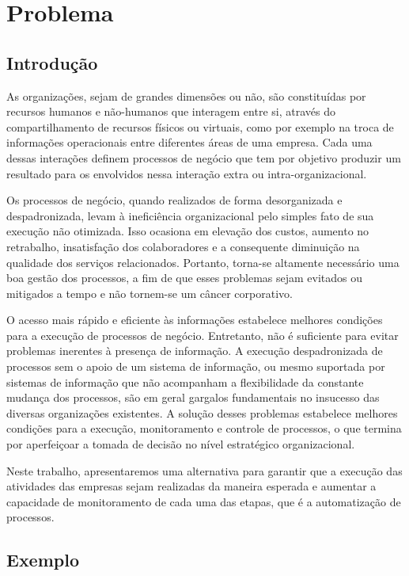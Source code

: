\chapter{Problema}\label{chp:problema}

\section{Introdução}\label{sec:problema-introducao}

As organizações, sejam de grandes dimensões ou não, são constituídas por recursos humanos e não-humanos que interagem entre si, através do compartilhamento de recursos físicos ou virtuais, como por exemplo na troca de informações operacionais entre diferentes áreas de uma empresa. Cada uma dessas interações definem processos de negócio que tem por objetivo produzir um resultado para os envolvidos nessa interação extra ou intra-organizacional.

Os processos de negócio, quando realizados de forma desorganizada e despadronizada, levam à ineficiência organizacional pelo simples fato de sua execução não otimizada. Isso ocasiona em elevação dos custos, aumento no retrabalho, insatisfação dos colaboradores e a consequente diminuição na qualidade dos serviços relacionados. Portanto, torna-se altamente necessário uma boa gestão dos processos, a fim de que esses problemas sejam evitados ou mitigados a tempo e não tornem-se um câncer corporativo.

O acesso mais rápido e eficiente às informações estabelece melhores condições para a execução de processos de negócio. Entretanto, não é suficiente para evitar problemas inerentes à presença de informação. A execução despadronizada de processos sem o apoio de um sistema de informação, ou mesmo suportada por sistemas de informação que não acompanham a flexibilidade da constante mudança dos processos, são em geral gargalos fundamentais no insucesso das diversas organizações existentes. A solução desses problemas estabelece melhores condições para a execução, monitoramento e controle de processos, o que termina por aperfeiçoar a tomada de decisão no nível estratégico organizacional.

Neste trabalho, apresentaremos uma alternativa para garantir que a execução das atividades das empresas sejam realizadas da maneira esperada e aumentar a capacidade de monitoramento de cada uma das etapas, que é a automatização de processos. 

\section{Exemplo}\label{sec:problema-exemplo}

